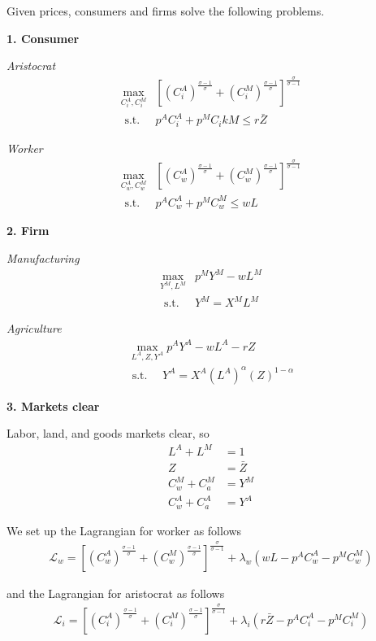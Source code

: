 Given prices, consumers and firms solve the following problems.

\textbf{1. Consumer}

\textit{Aristocrat}
\begin{align}
\max _{C_i^A, C_i^M} & {\left[\left(C_i^A\right)^{\frac{\sigma-1}{\sigma}}+\left(C_i^M\right)^{\frac{\sigma-1}{\sigma}}\right]^{\frac{\sigma}{\sigma-1}} } \\
\text { s.t. } & p^A C_i^A+p^M C_ikM \leq r \bar{Z}
\end{align}

\textit{Worker}
\begin{align}
\max _{C_w^A, C_w^M} & {\left[\left(C_w^A\right)^{\frac{\sigma-1}{\sigma}}+\left(C_w^M\right)^{\frac{\sigma-1}{\sigma}}\right]^{\frac{\sigma}{\sigma-1}} } \\
\text { s.t. } & p^A C_w^A+p^M C_w^M \leqslant wL
\end{align}

\textbf{2. Firm}

\textit{Manufacturing}
\begin{align}
\max _{Y^M, L^M} & p^M Y^M-w L^M \\
\text { s.t. } & Y^M=X^M L^M
\end{align}

\textit{Agriculture}
\begin{align}
\max _{L^A, Z, Y^A} p^A Y^A-w L^A-r Z \\
\text { s.t. } \quad Y^A=X^A\left(L^A\right)^\alpha(Z)^{1-\alpha}
\end{align}

\textbf{3. Markets clear}

Labor, land, and goods markets clear, so
\begin{align}
    L^A+L^M & =1 \\
    Z & =\bar{Z} \\
    C_w^M+C_a^M & =Y^M \\
    C_w^A+C_a^A & =Y^A
\end{align}


We set up the Lagrangian for worker as follows
\begin{align}
    \mathcal{L}_w=\left[\left(C_w^A\right)^{\frac{\sigma-1}{\sigma}}+\left(C_w^M\right)^{\frac{\sigma-1}{\sigma}}\right]^{\frac{\sigma}{\sigma-1}}+\lambda_w\left(wL-p^A C_w^A-p^M C_w^M\right)
\end{align}

and the Lagrangian for aristocrat as follows
\begin{align}
    \mathcal{L}_i=\left[\left(C_i^A\right)^{\frac{\sigma-1}{\sigma}}+\left(C_i^M\right)^{\frac{\sigma-1}{\sigma}}\right]^{\frac{\sigma}{\sigma-1}}+\lambda_i\left(r\bar{Z}-p^A C_i^A-p^M C_i^M\right)
\end{align}

